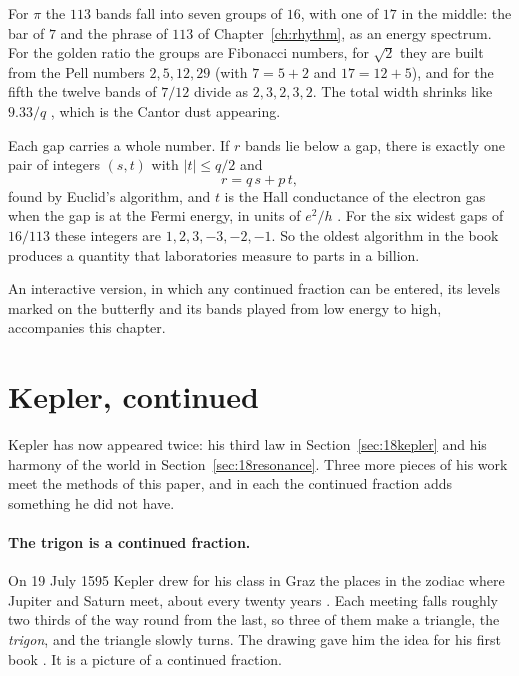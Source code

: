 For $\pi$ the $113$ bands fall into seven groups of $16$, with one of $17$ in the middle: the bar of $7$
and the phrase of $113$ of Chapter~\ref{ch:rhythm}, as an energy spectrum. For the golden ratio the groups are
Fibonacci numbers, for $\sqrt2$ they are built from the Pell numbers $2,5,12,29$ (with $7=5+2$ and $17=12+5$), and for the fifth the twelve bands of
$7/12$ divide as $2,3,2,3,2$. The total width shrinks like $9.33/q$ \cite{thouless1983}, which is the
Cantor dust appearing.

Each gap carries a whole number. If $r$ bands lie below a gap, there is exactly one pair of integers
$(s,t)$ with $|t|\le q/2$ and
\[
  r=q\,s+p\,t ,
\]
found by Euclid's algorithm, and $t$ is the Hall conductance of the electron gas when the gap is at the
Fermi energy, in units of $e^{2}/h$ \cite{tknn1982}. For the six widest gaps of $16/113$ these integers
are $1,2,3,-3,-2,-1$. So the oldest algorithm in the book produces a quantity that laboratories measure
to parts in a billion.

An interactive version, in which any continued fraction can be entered, its levels marked on the
butterfly and its bands played from low energy to high, accompanies this chapter.

\section{Kepler, continued}\label{sec:18keplercont}

Kepler has now appeared twice: his third law in Section~\ref{sec:18kepler} and his harmony of the world
in Section~\ref{sec:18resonance}. Three more pieces of his work meet the methods of this paper, and in
each the continued fraction adds something he did not have.

\paragraph{The trigon is a continued fraction.} On 19 July 1595 Kepler drew for his class in Graz the places
in the zodiac where Jupiter and Saturn meet, about every twenty years \cite{gingerich1973}. Each meeting falls roughly two thirds of
the way round from the last, so three of them make a triangle, the \emph{trigon}, and the triangle slowly
turns. The drawing gave him the idea for his first book \cite{kepler1596}. It is a picture of a continued
fraction.

